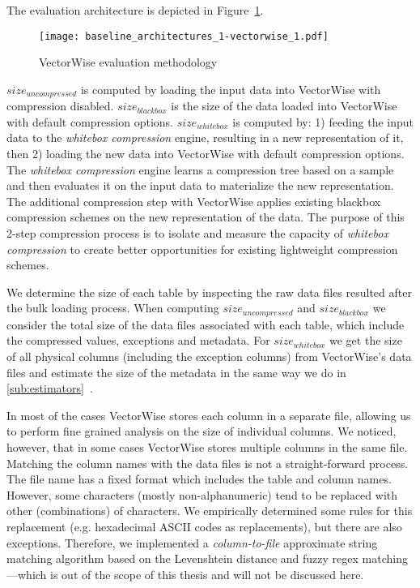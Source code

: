The evaluation architecture is depicted in Figure~\ref{fig:eval:methodology:vectorwisebaseline}.

\begin{figure}[h]
  \centering
  \texttt{[image: baseline\_architectures\_1-vectorwise\_1.pdf]}
  \caption{VectorWise evaluation methodology}
  \label{fig:eval:methodology:vectorwisebaseline}
\end{figure}

\(size_{uncompressed}\) is computed by loading the input data into VectorWise with compression disabled. \(size_{blackbox}\) is the size of the data loaded into VectorWise with default compression options. \(size_{whitebox}\) is computed by: 1) feeding the input data to the \textit{whitebox compression} engine, resulting in a new representation of it, then 2) loading the new data into VectorWise with default compression options. The \textit{whitebox compression} engine learns a compression tree based on a sample and then evaluates it on the input data to materialize the new representation. The additional compression step with VectorWise applies existing blackbox compression schemes on the new representation of the data. The purpose of this 2-step compression process is to isolate and measure the capacity of \textit{whitebox compression} to create better opportunities for existing lightweight compression schemes.

We determine the size of each table by inspecting the raw data files resulted after the bulk loading process. When computing \(size_{uncompressed}\) and \(size_{blackbox}\) we consider the total size of the data files associated with each table, which include the compressed values, exceptions and metadata. For \(size_{whitebox}\) we get the size of all physical columns (including the exception columns) from VectorWise's data files and estimate the size of the metadata in the same way we do in \ref{sub:estimators}~.

In most of the cases VectorWise stores each column in a separate file, allowing us to perform fine grained analysis on the size of individual columns. We noticed, however, that in some cases VectorWise stores multiple columns in the same file. Matching the column names with the data files is not a straight-forward process. The file name has a fixed format which includes the table and column names. However, some characters (mostly non-alphanumeric) tend to be replaced with other (combinations) of characters. We empirically determined some rules for this replacement (e.g. hexadecimal ASCII codes as replacements), but there are also exceptions. Therefore, we implemented a \textit{column-to-file} approximate string matching algorithm based on the Levenshtein distance \cite{levenshtein1966binary} and fuzzy regex matching \cite{pypiregex}---which is out of the scope of this thesis and will not be discussed here.

